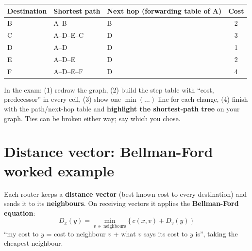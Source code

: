 \documentclass[10pt]{article}
\begin{document}
\begin{center}\small
\begin{tabular}{lllc}
\toprule
\textbf{Destination} & \textbf{Shortest path} & \textbf{Next hop (forwarding table of A)} & \textbf{Cost}\\\midrule
B & A--B & B & 2\\
C & A--D--E--C & D & 3\\
D & A--D & D & 1\\
E & A--D--E & D & 2\\
F & A--D--E--F & D & 4\\
\bottomrule
\end{tabular}
\end{center}
\begin{examtip}
In the exam: (1) redraw the graph, (2) build the step table with ``cost, predecessor'' in every cell, (3) show one $\min(\dots)$ line for each change, (4) finish with the path/next-hop table and \textbf{highlight the shortest-path tree} on your graph. Ties can be broken either way; say which you chose.
\end{examtip}

\section{Distance vector: Bellman-Ford worked example}\label{sec:dv}

Each router keeps a \textbf{distance vector} (best known cost to every destination) and sends it to its \textbf{neighbours}. On receiving vectors it applies the \textbf{Bellman-Ford equation}:
\[
D_x(y) = \min_{v \,\in\, \text{neighbours}} \big\{\, c(x,v) + D_v(y) \,\big\}
\]
``my cost to $y$ = cost to neighbour $v$ + what $v$ says its cost to $y$ is'', taking the cheapest neighbour.
\end{document}
